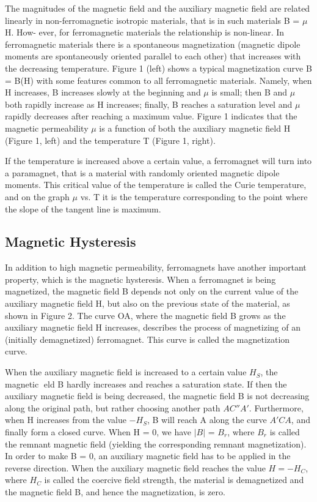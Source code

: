 \documentclass{article}
\begin{document}
The magnitudes of the magnetic field and the auxiliary magnetic field are related
linearly in non-ferromagnetic isotropic materials, that is in such materials B = $\mu$H. How-
ever, for ferromagnetic materials the relationship is non-linear. In ferromagnetic materials
there is a spontaneous magnetization (magnetic dipole moments are spontaneously oriented parallel to each other) that increases with the decreasing temperature. Figure 1
(left) shows a typical magnetization curve B = B(H) with some features common to all
ferromagnetic materials. Namely, when H increases, B increases slowly at the beginning
and $\mu$ is small; then B and $\mu$ both rapidly increase as H increases; finally, B reaches a
saturation level and $\mu$ rapidly decreases after reaching a maximum value. Figure 1 indicates that the magnetic permeability $\mu$ is a function of both the auxiliary magnetic field
H (Figure 1, left) and the temperature T (Figure 1, right).

If the temperature is increased above a certain value, a ferromagnet will turn into a
paramagnet, that is a material with randomly oriented magnetic dipole moments. This
critical value of the temperature is called the Curie temperature, and on the graph $\mu$ vs.
T it is the temperature corresponding to the point where the slope of the tangent line is
maximum.

\subsection{Magnetic Hysteresis}
In addition to high magnetic permeability, ferromagnets have another important property, which is the magnetic hysteresis. When a ferromagnet is being magnetized, the
magnetic field B depends not only on the current value of the auxiliary magnetic field
H, but also on the previous state of the material, as shown in Figure 2. The curve OA,
where the magnetic field B grows as the auxiliary magnetic field H increases, describes
the process of magnetizing of an (initially demagnetized) ferromagnet. This curve is called the magnetization curve.

When the auxiliary magnetic field is increased to a certain value $H_S$, the magnetic eld
B hardly increases and reaches a saturation state. If then the auxiliary magnetic field is
being decreased, the magnetic field B is not decreasing along the original path, but rather choosing another path $AC''A'$. Furthermore, when H increases from the value $-H_S$, B
will reach A along the curve $A'CA$, and finally form a closed curve. When H = 0, we
have $|B|$ = $B_r$, where $B_r$ is called the remnant magnetic field (yielding the corresponding
remnant magnetization). In order to make B = 0, an auxiliary magnetic field has to
be applied in the reverse direction. When the auxiliary magnetic field reaches the value
$H = -H_C$, where $H_C$ is called the coercive field strength, the material is demagnetized
and the magnetic field B, and hence the magnetization, is zero.
\end{document}

